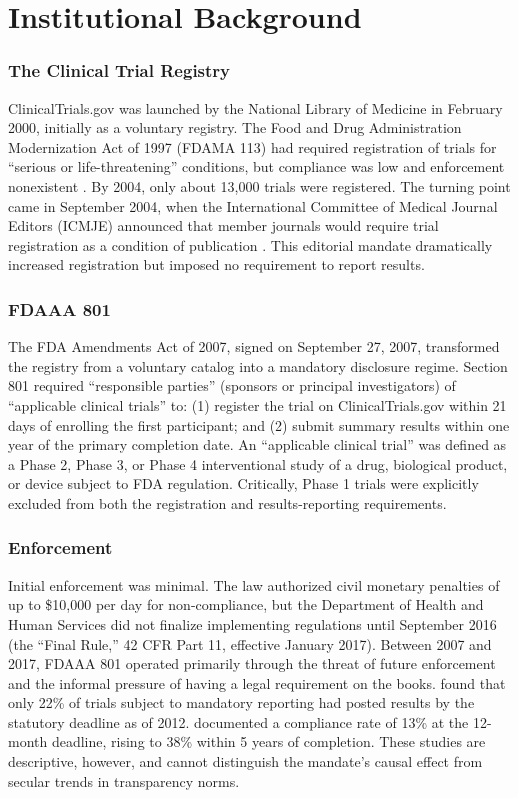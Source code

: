 \documentclass[12pt]{article}
\begin{document}
\section{Institutional Background}

\subsubsection*{The Clinical Trial Registry} ClinicalTrials.gov was launched by the National Library of Medicine in February 2000, initially as a voluntary registry. The Food and Drug Administration Modernization Act of 1997 (FDAMA 113) had required registration of trials for ``serious or life-threatening'' conditions, but compliance was low and enforcement nonexistent \citep{zarin2011trial}. By 2004, only about 13,000 trials were registered. The turning point came in September 2004, when the International Committee of Medical Journal Editors (ICMJE) announced that member journals would require trial registration as a condition of publication \citep{deangelis2004clinical}. This editorial mandate dramatically increased registration but imposed no requirement to report results.

\subsubsection*{FDAAA 801} The FDA Amendments Act of 2007, signed on September 27, 2007, transformed the registry from a voluntary catalog into a mandatory disclosure regime. Section 801 required ``responsible parties'' (sponsors or principal investigators) of ``applicable clinical trials'' to: (1) register the trial on ClinicalTrials.gov within 21 days of enrolling the first participant; and (2) submit summary results within one year of the primary completion date. An ``applicable clinical trial'' was defined as a Phase 2, Phase 3, or Phase 4 interventional study of a drug, biological product, or device subject to FDA regulation. Critically, Phase 1 trials were explicitly excluded from both the registration and results-reporting requirements.

\subsubsection*{Enforcement} Initial enforcement was minimal. The law authorized civil monetary penalties of up to \$10,000 per day for non-compliance, but the Department of Health and Human Services did not finalize implementing regulations until September 2016 (the ``Final Rule,'' 42 CFR Part 11, effective January 2017). Between 2007 and 2017, FDAAA 801 operated primarily through the threat of future enforcement and the informal pressure of having a legal requirement on the books. \citet{prayle2012compliance} found that only 22\% of trials subject to mandatory reporting had posted results by the statutory deadline as of 2012. \citet{anderson2015compliance} documented a compliance rate of 13\% at the 12-month deadline, rising to 38\% within 5 years of completion. These studies are descriptive, however, and cannot distinguish the mandate's causal effect from secular trends in transparency norms.
\end{document}
